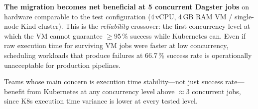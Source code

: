\textbf{The migration becomes net beneficial at 5 concurrent Dagster jobs} on hardware comparable to the test configuration (4\,vCPU, 4\,GB RAM VM / single-node Kind cluster).
This is the \emph{reliability} crossover: the first concurrency level at which the VM cannot guarantee $\geq$95\,\% success while Kubernetes can.
Even if raw execution time for surviving VM jobs were faster at low concurrency, scheduling workloads that produce failures at 66.7\,\% success rate is operationally unacceptable for production pipelines.

Teams whose main concern is execution time stability---not just success rate---benefit from Kubernetes at any concurrency level above $\approx$3 concurrent jobs, since K8s execution time variance is lower at every tested level.

